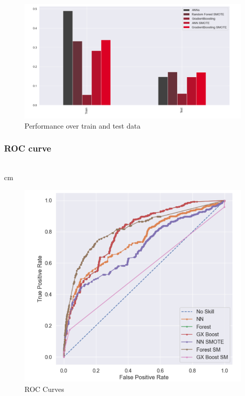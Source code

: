 \begin{figure}[H]
    \centering
    \includegraphics[width=\linewidth]{figures/results.PNG}
    \caption{Performance over train and test data}
    \label{fig:test_train}
\end{figure}

\subsubsection{ROC curve}\hspace*{\fill} \\
cm
\begin{figure}[H]
    \centering
    \includegraphics[width=\linewidth]{figures/roc_res.PNG}
    \caption{ROC Curves}
    \label{fig:my_label}
\end{figure}

